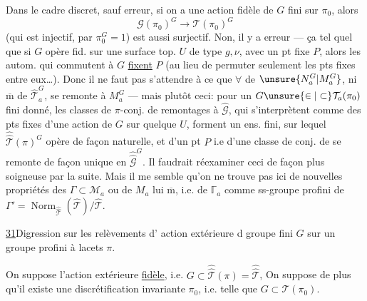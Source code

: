 Dans le cadre discret, sauf erreur, si on a une action fidèle  de $G$ fini sur $\pi_0$, alors 
\[
\mathcal G(\pi_0)^G\longrightarrow\mathcal T(\pi_0)^G
\]
(qui est injectif, par $\pi_0^G=1$) est aussi surjectif. Non, il y a erreur --- ça  tel quel que si $G$ opère fid. sur une surface top. $U$ de type $g,\nu$, avec un pt fixe $P$, alors les autom. qui commutent à $G$ \uline{fixent} $P$ (au lieu de permuter seulement les pts fixes entre eux\ldots). Donc il ne faut pas s'attendre à ce que $\forall$  de $\unsure{N_a^G|M_a^G}$, ni $\overline{\mathrm m}$ de $\widehat{\mathcal T}_a^G$, se remonte à $M_a^G$ --- mais plutôt ceci: pour un $G\unsure{\in|\subset}\mathcal T_a(\pi_0)$  fini donné, les classes de $\pi$-conj. de remontages à $\widehat{\mathcal G}$,  qui s'interprètent comme des pts fixes d'une action de $G$ sur quelque $U$, forment un ens. fini, sur lequel $\widehat{\widehat{\mathcal T}}(\pi)^G$ opère de façon naturelle, et   d'un pt $P$ i.e d'une classe de conj. de 
se remonte de façon unique en
$\widehat{\widehat{\mathcal G}}^{G}$.
Il faudrait réexaminer ceci de façon plus soigneuse par la suite.
Mais il me semble qu'on ne trouve pas ici de nouvelles propriétés des
$\Gamma\subset\mathcal M_a$ ou de
$M_a$ lui $\overline{\mathrm m}$, i.e. de
$\mathbb{\Gamma}_a$ comme ss-groupe profini de
$\Gamma'=\operatorname{Norm}_{\widehat{\widehat{\mathcal T}}}
(\widehat{\mathcal T})/\widehat{\mathcal T}$.

\uline{31}\quad Digression sur les relèvements
d' action extérieure
d groupe fini $G$ sur un
groupe profini à lacets $\pi$.

On suppose l'action extérieure \uline{fidèle},
i.e. $G\subset\widehat{\widehat{\mathcal T}}(\pi)
=\widehat{\widehat{\mathcal T}}$,
On suppose de plus qu'il existe une discrétification
invariante $\pi_0$, i.e. telle que
$G\subset\mathcal T(\pi_0)$.

